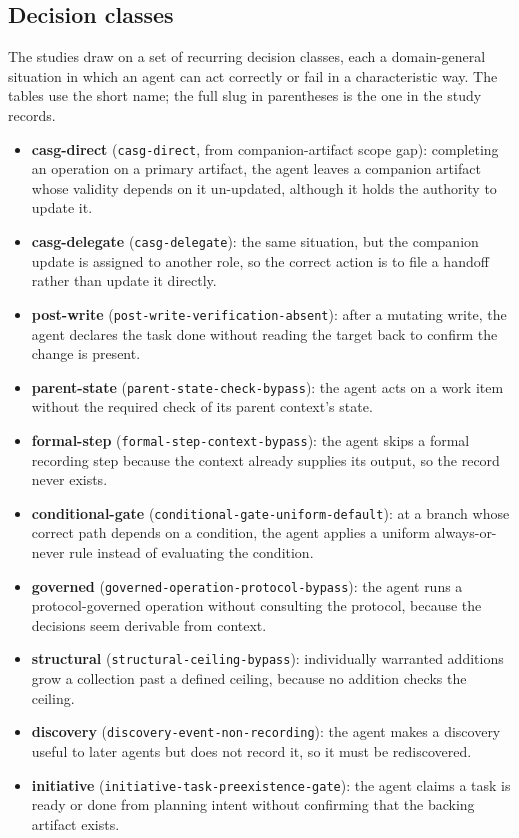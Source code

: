 \documentclass[11pt,a4paper]{article}
\begin{document}
\subsection{Decision classes}\label{sec:classes}

The studies draw on a set of recurring decision classes, each a domain-general situation
in which an agent can act correctly or fail in a characteristic way. The tables use the
short name; the full slug in parentheses is the one in the study records.

\begin{itemize}
  \item \textbf{casg-direct} (\texttt{casg-direct}, from companion-artifact scope gap):
    completing an operation on a primary artifact, the agent leaves a companion artifact
    whose validity depends on it un-updated, although it holds the authority to update it.
  \item \textbf{casg-delegate} (\texttt{casg-delegate}): the same situation, but the
    companion update is assigned to another role, so the correct action is to file a
    handoff rather than update it directly.
  \item \textbf{post-write} (\texttt{post-write-verification-absent}): after a mutating
    write, the agent declares the task done without reading the target back to confirm the
    change is present.
  \item \textbf{parent-state} (\texttt{parent-state-check-bypass}): the agent acts on a
    work item without the required check of its parent context's state.
  \item \textbf{formal-step} (\texttt{formal-step-context-bypass}): the agent skips a
    formal recording step because the context already supplies its output, so the record
    never exists.
  \item \textbf{conditional-gate} (\texttt{conditional-gate-uniform-default}): at a branch
    whose correct path depends on a condition, the agent applies a uniform
    always-or-never rule instead of evaluating the condition.
  \item \textbf{governed} (\texttt{governed-operation-protocol-bypass}): the agent runs a
    protocol-governed operation without consulting the protocol, because the decisions
    seem derivable from context.
  \item \textbf{structural} (\texttt{structural-ceiling-bypass}): individually warranted
    additions grow a collection past a defined ceiling, because no addition checks the
    ceiling.
  \item \textbf{discovery} (\texttt{discovery-event-non-recording}): the agent makes a
    discovery useful to later agents but does not record it, so it must be rediscovered.
  \item \textbf{initiative} (\texttt{initiative-task-preexistence-gate}): the agent claims
    a task is ready or done from planning intent without confirming that the backing
    artifact exists.
\end{itemize}
\end{document}
